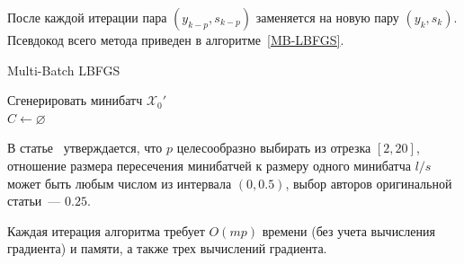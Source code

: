 \documentclass[preprint,12pt]{elsarticle}
\begin{document}
После каждой итерации пара $(y_{k - p}, s_{k - p})$ заменяется на новую пару $(y_k, s_k)$. 
Псевдокод всего метода приведен в алгоритме~\ref{MB-LBFGS}.\\
\begin{algorithm}[H]\label{MB-LBFGS}
\caption {Multi-Batch LBFGS}
\SetAlgoLined
{}
 Сгенерировать минибатч $\mathcal{X}_0'$\\
 $C \leftarrow \varnothing$\\
\end{algorithm}
В статье~\cite{multibatchLBFGS} утверждается, что $p$ целесообразно выбирать из отрезка $[2, 20]$, отношение размера пересечения минибатчей к размеру одного минибатча $l/s$ может быть любым числом из интервала $(0, 0.5)$, выбор авторов оригинальной статьи~--- $0.25$. 

Каждая итерация алгоритма требует $O(mp)$ времени (без учета вычисления градиента) и памяти, а также трех вычислений градиента.
\end{document}
